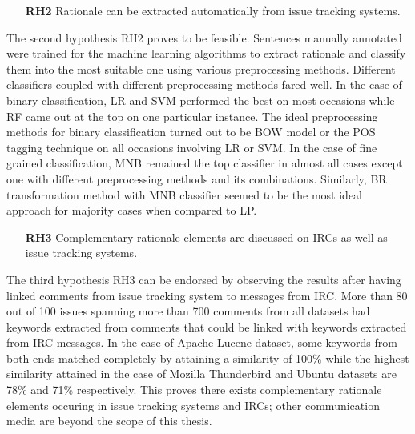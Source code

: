 \documentclass[a4paper,12pt,twoside]{report}
\begin{document}
\begin{itemize}
\item[\textbf{RH2}] Rationale can be extracted automatically from issue tracking systems.
\end{itemize}
The second hypothesis RH2 proves to be feasible. Sentences manually annotated were trained for the machine learning algorithms to extract rationale and classify them into the most suitable one using various preprocessing methods. Different classifiers coupled with different preprocessing methods fared well. In the case of binary classification, \acs{LR} and \acs{SVM} performed the best on most occasions while \acs{RF} came out at the top on one particular instance. The ideal preprocessing methods for binary classification turned out to be \acs{BOW} model or the \acs{POS} tagging technique on all occasions involving \acs{LR} or \acs{SVM}. In the case of fine grained classification, \acs{MNB} remained the top classifier in almost all cases except one with different preprocessing methods and its combinations. Similarly, \acs{BR} transformation method with \acs{MNB} classifier seemed to be the most ideal approach for majority cases when compared to \acs{LP}. 

\begin{itemize}
\item[\textbf{RH3}] Complementary rationale elements are discussed on \acs{IRC}s as well as issue tracking systems.
\end{itemize}
The third hypothesis RH3 can be endorsed by observing the results after having linked comments from issue tracking system to messages from \acs{IRC}. More than 80 out of 100 issues spanning more than 700 comments from all datasets had keywords extracted from comments that could be linked with keywords extracted from \acs{IRC} messages. In the case of Apache Lucene dataset, some keywords from both ends matched completely by attaining a similarity of 100\% while the highest similarity attained in the case of Mozilla Thunderbird and Ubuntu datasets are 78\% and 71\% respectively. This proves there exists complementary rationale elements occuring in issue tracking systems and \acs{IRC}s; other communication media are beyond the scope of this thesis.
\end{document}
